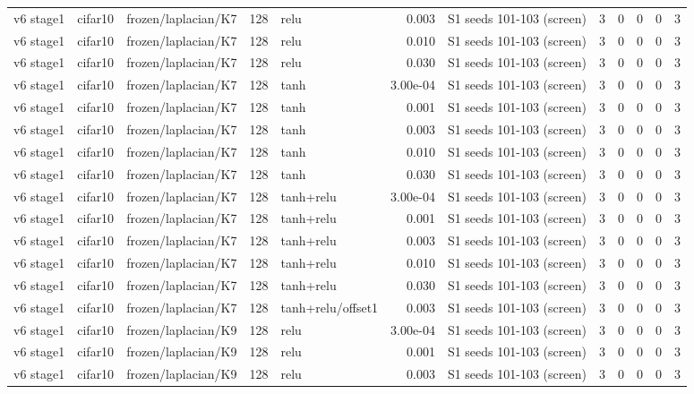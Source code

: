 \begin{table}[htbp]
{\begin{tabular}{@{}lllrlrlrrrrr@{}}
v6 stage1 & cifar10 & frozen/laplacian/K7 & 128 & relu & 0.003 & S1 seeds 101-103 (screen) & 3 & 0 & 0 & 0 & 3 \\
v6 stage1 & cifar10 & frozen/laplacian/K7 & 128 & relu & 0.010 & S1 seeds 101-103 (screen) & 3 & 0 & 0 & 0 & 3 \\
v6 stage1 & cifar10 & frozen/laplacian/K7 & 128 & relu & 0.030 & S1 seeds 101-103 (screen) & 3 & 0 & 0 & 0 & 3 \\
v6 stage1 & cifar10 & frozen/laplacian/K7 & 128 & tanh & 3.00e-04 & S1 seeds 101-103 (screen) & 3 & 0 & 0 & 0 & 3 \\
v6 stage1 & cifar10 & frozen/laplacian/K7 & 128 & tanh & 0.001 & S1 seeds 101-103 (screen) & 3 & 0 & 0 & 0 & 3 \\
v6 stage1 & cifar10 & frozen/laplacian/K7 & 128 & tanh & 0.003 & S1 seeds 101-103 (screen) & 3 & 0 & 0 & 0 & 3 \\
v6 stage1 & cifar10 & frozen/laplacian/K7 & 128 & tanh & 0.010 & S1 seeds 101-103 (screen) & 3 & 0 & 0 & 0 & 3 \\
v6 stage1 & cifar10 & frozen/laplacian/K7 & 128 & tanh & 0.030 & S1 seeds 101-103 (screen) & 3 & 0 & 0 & 0 & 3 \\
v6 stage1 & cifar10 & frozen/laplacian/K7 & 128 & tanh+relu & 3.00e-04 & S1 seeds 101-103 (screen) & 3 & 0 & 0 & 0 & 3 \\
v6 stage1 & cifar10 & frozen/laplacian/K7 & 128 & tanh+relu & 0.001 & S1 seeds 101-103 (screen) & 3 & 0 & 0 & 0 & 3 \\
v6 stage1 & cifar10 & frozen/laplacian/K7 & 128 & tanh+relu & 0.003 & S1 seeds 101-103 (screen) & 3 & 0 & 0 & 0 & 3 \\
v6 stage1 & cifar10 & frozen/laplacian/K7 & 128 & tanh+relu & 0.010 & S1 seeds 101-103 (screen) & 3 & 0 & 0 & 0 & 3 \\
v6 stage1 & cifar10 & frozen/laplacian/K7 & 128 & tanh+relu & 0.030 & S1 seeds 101-103 (screen) & 3 & 0 & 0 & 0 & 3 \\
v6 stage1 & cifar10 & frozen/laplacian/K7 & 128 & tanh+relu/offset1 & 0.003 & S1 seeds 101-103 (screen) & 3 & 0 & 0 & 0 & 3 \\
v6 stage1 & cifar10 & frozen/laplacian/K9 & 128 & relu & 3.00e-04 & S1 seeds 101-103 (screen) & 3 & 0 & 0 & 0 & 3 \\
v6 stage1 & cifar10 & frozen/laplacian/K9 & 128 & relu & 0.001 & S1 seeds 101-103 (screen) & 3 & 0 & 0 & 0 & 3 \\
v6 stage1 & cifar10 & frozen/laplacian/K9 & 128 & relu & 0.003 & S1 seeds 101-103 (screen) & 3 & 0 & 0 & 0 & 3 \\

\end{tabular}}
\end{table}
